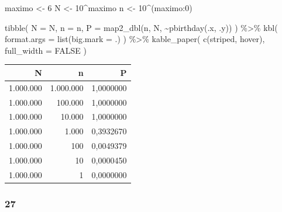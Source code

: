 \documentclass[
  11pt]{report}
\newenvironment{Shaded}{\begin{snugshade}}{\end{snugshade}}
\newcommand{\AttributeTok}[1]{\textcolor[rgb]{0.77,0.63,0.00}{#1}}
\newcommand{\ConstantTok}[1]{\textcolor[rgb]{0.00,0.00,0.00}{#1}}
\newcommand{\DecValTok}[1]{\textcolor[rgb]{0.00,0.00,0.81}{#1}}
\newcommand{\FunctionTok}[1]{\textcolor[rgb]{0.00,0.00,0.00}{#1}}
\newcommand{\NormalTok}[1]{#1}
\newcommand{\OtherTok}[1]{\textcolor[rgb]{0.56,0.35,0.01}{#1}}
\newcommand{\SpecialCharTok}[1]{\textcolor[rgb]{0.00,0.00,0.00}{#1}}
\newcommand{\StringTok}[1]{\textcolor[rgb]{0.31,0.60,0.02}{#1}}
\renewenvironment{Shaded}{
    \begin{mdframed}[%
      roundcorner=2pt,%
      innerleftmargin=5pt,%
      innerrightmargin=5pt,%
      topline=true,%
      leftline=true,%
      rightline=true,%
      bottomline=true,%
      linewidth=0.5pt,%
      linecolor=black!20,%
      backgroundcolor=black!2,%
      skipabove=2ex,%
      skipbelow=2.5ex%
    ]%
  }
  {
    \end{mdframed}
  }
\begin{document}
\begin{Shaded}
\begin{Highlighting}[]
\NormalTok{maximo }\OtherTok{\textless{}{-}} \DecValTok{6}
\NormalTok{N }\OtherTok{\textless{}{-}} \DecValTok{10}\SpecialCharTok{\^{}}\NormalTok{maximo}
\NormalTok{n }\OtherTok{\textless{}{-}} \DecValTok{10}\SpecialCharTok{\^{}}\NormalTok{(maximo}\SpecialCharTok{:}\DecValTok{0}\NormalTok{)}

\FunctionTok{tibble}\NormalTok{(}
  \AttributeTok{N =}\NormalTok{ N,}
  \AttributeTok{n =}\NormalTok{ n,}
  \AttributeTok{P =} \FunctionTok{map2\_dbl}\NormalTok{(n, N, }\SpecialCharTok{\textasciitilde{}}\FunctionTok{pbirthday}\NormalTok{(.x, .y))}
\NormalTok{) }\SpecialCharTok{\%\textgreater{}\%} 
  \FunctionTok{kbl}\NormalTok{(}
    \AttributeTok{format.args =} \FunctionTok{list}\NormalTok{(}\AttributeTok{big.mark =} \StringTok{\textquotesingle{}.\textquotesingle{}}\NormalTok{)}
\NormalTok{  ) }\SpecialCharTok{\%\textgreater{}\%} 
  \FunctionTok{kable\_paper}\NormalTok{(}
    \FunctionTok{c}\NormalTok{(}\StringTok{\textquotesingle{}striped\textquotesingle{}}\NormalTok{, }\StringTok{\textquotesingle{}hover\textquotesingle{}}\NormalTok{),}
    \AttributeTok{full\_width =} \ConstantTok{FALSE}
\NormalTok{  )}
\end{Highlighting}
\end{Shaded}

\begin{table}
\centering
\begin{tabular}[t]{r|r|r}
\hline
N & n & P\\
\hline
1.000.000 & 1.000.000 & 1,0000000\\
\hline
1.000.000 & 100.000 & 1,0000000\\
\hline
1.000.000 & 10.000 & 1,0000000\\
\hline
1.000.000 & 1.000 & 0,3932670\\
\hline
1.000.000 & 100 & 0,0049379\\
\hline
1.000.000 & 10 & 0,0000450\\
\hline
1.000.000 & 1 & 0,0000000\\
\hline
\end{tabular}
\end{table}

\hypertarget{section-6}{%
\subsubsection*{27}\label{section-6}}
\end{document}
